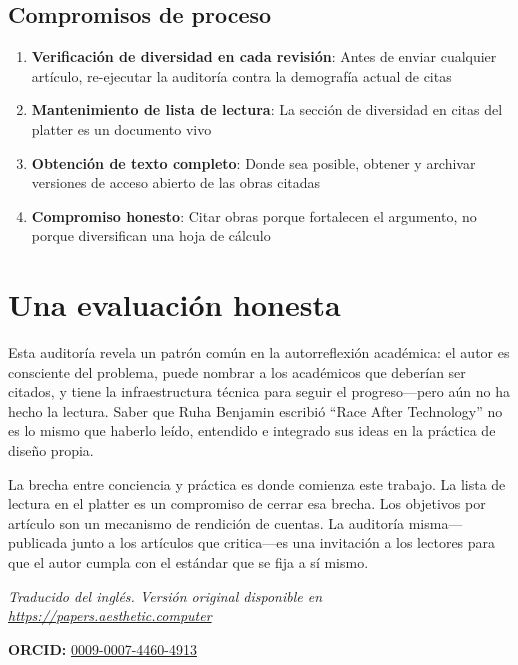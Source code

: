 \documentclass[10pt,letterpaper,twocolumn]{article}
\begin{document}
\subsection{Compromisos de proceso}

\begin{enumerate}
  \item \textbf{Verificación de diversidad en cada revisión}: Antes de enviar cualquier artículo, re-ejecutar la auditoría contra la demografía actual de citas
  \item \textbf{Mantenimiento de lista de lectura}: La sección de diversidad en citas del platter es un documento vivo
  \item \textbf{Obtención de texto completo}: Donde sea posible, obtener y archivar versiones de acceso abierto de las obras citadas
  \item \textbf{Compromiso honesto}: Citar obras porque fortalecen el argumento, no porque diversifican una hoja de cálculo
\end{enumerate}

\section{Una evaluación honesta}

Esta auditoría revela un patrón común en la autorreflexión académica: el autor es consciente del problema, puede nombrar a los académicos que deberían ser citados, y tiene la infraestructura técnica para seguir el progreso---pero aún no ha hecho la lectura. Saber que Ruha Benjamin escribió ``Race After Technology'' no es lo mismo que haberlo leído, entendido e integrado sus ideas en la práctica de diseño propia.

La brecha entre conciencia y práctica es donde comienza este trabajo. La lista de lectura en el platter es un compromiso de cerrar esa brecha. Los objetivos por artículo son un mecanismo de rendición de cuentas. La auditoría misma---publicada junto a los artículos que critica---es una invitación a los lectores para que el autor cumpla con el estándar que se fija a sí mismo.

\vspace{0.5em}
\noindent\textit{Traducido del inglés. Versión original disponible en \url{https://papers.aesthetic.computer}}

\vspace{0.5em}
\noindent\textbf{ORCID:} \href{https://orcid.org/0009-0007-4460-4913}{0009-0007-4460-4913}



\end{document}
